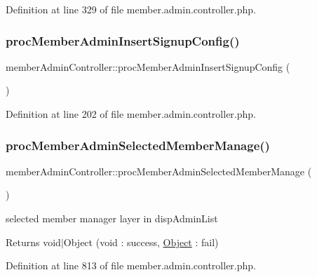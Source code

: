 Definition at line 329 of file member.\+admin.\+controller.\+php.

\mbox{\label{classmemberAdminController_a9e134d115f4fa383b20ec2b7c8cae444}} 
\subsubsection{\texorpdfstring{proc\+Member\+Admin\+Insert\+Signup\+Config()}{procMemberAdminInsertSignupConfig()}}
{\footnotesize\ttfamily member\+Admin\+Controller\+::proc\+Member\+Admin\+Insert\+Signup\+Config (\begin{DoxyParamCaption}{ }\end{DoxyParamCaption})}



Definition at line 202 of file member.\+admin.\+controller.\+php.

\mbox{\label{classmemberAdminController_ab80e03747fc4079068d0ed6a086fbd8f}} 
\subsubsection{\texorpdfstring{proc\+Member\+Admin\+Selected\+Member\+Manage()}{procMemberAdminSelectedMemberManage()}}
{\footnotesize\ttfamily member\+Admin\+Controller\+::proc\+Member\+Admin\+Selected\+Member\+Manage (\begin{DoxyParamCaption}{ }\end{DoxyParamCaption})}

selected member manager layer in disp\+Admin\+List \begin{DoxyReturn}{Returns}
void$\vert$\+Object (void \+: success, \hyperlink{classObject}{Object} \+: fail) 
\end{DoxyReturn}


Definition at line 813 of file member.\+admin.\+controller.\+php.

